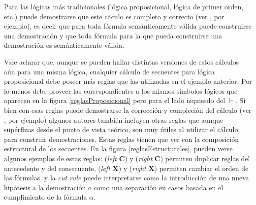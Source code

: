 \bigskip

Para las lógicas más tradicionales (lógica proposicional, lógica de primer orden, etc.) puede demostrarse que este cáculo es completo y correcto (ver \cite{bookFoundations}, por ejemplo), es decir que para toda fórmula semánticamente válida puede construirse una demostración y que toda fórmula para la que pueda construirse una demostración es semánticamente válida.

\bigskip

Vale aclarar que, aunque se pueden hallar distintas versiones de estos cálculos aún para una misma lógica, cualquier cálculo de secuentes para lógica proposicional debe poseer más reglas que las utilizadas en el ejemplo anterior.
Por lo menos debe proveer las correspondientes a los mismos símbolos lógicos que aparecen en la figura \ref{reglasProposicional} pero para el lado izquierdo del $\vdash$.
Si bien con esas reglas puede demostrarse la corrección y compleción del cálculo (ver \cite{bookFoundations}, por ejemplo) algunos autores también incluyen otras reglas que aunque supérfluas desde el punto de vista teórico, son muy útiles al utilizar el cálculo para construir demostraciones.
Estas reglas tienen que ver con la composición estructural de los secuentes.
En la figura \ref{reglasEstructurales}, pueden verse algunos ejemplos de estas reglas: (\emph{left} \textbf{C}) y (\emph{right} \textbf{C}) permiten duplicar reglas del antecedente y del consecuente, (\emph{left} \textbf{X}) y (\emph{right} \textbf{X}) permiten cambiar el orden de las fórmulas, y la \textit{cut rule} puede interpretarse como la introducción de una nueva hipótesis a la demostración o como una separación en casos basada en el cumplimiento de la fórmula $\alpha$.

